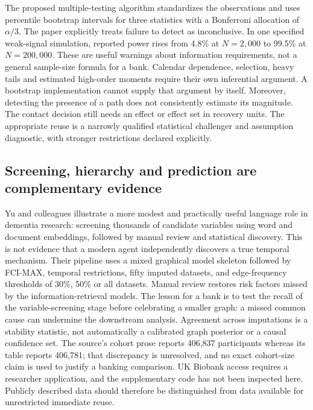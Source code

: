The proposed multiple-testing algorithm standardizes the observations and
uses percentile bootstrap intervals for three statistics with a Bonferroni
allocation of $\alpha/3$. The paper explicitly treats failure to detect as
inconclusive. In one specified weak-signal simulation, reported power rises
from 4.8\% at $N=2{,}000$ to 99.5\% at $N=200{,}000$. These are useful
warnings about information requirements, not a general sample-size formula
for a bank. Calendar dependence, selection, heavy tails and estimated
high-order moments require their own inferential argument. A bootstrap
implementation cannot supply that argument by itself. Moreover, detecting
the presence of a path does not consistently estimate its magnitude. The
contact decision still needs an effect or effect set in recovery units.
The appropriate reuse is a narrowly qualified statistical challenger and
assumption diagnostic, with stronger restrictions declared explicitly.
\citep{exec15_latent_shi}

\subsection{Screening, hierarchy and prediction are complementary evidence}

Yu and colleagues illustrate a more modest and practically useful language
role in dementia research: screening thousands of candidate variables using
word and document embeddings, followed by manual review and statistical
discovery. This is not evidence that a modern agent independently discovers
a true temporal mechanism. Their pipeline uses a mixed graphical model
skeleton followed by FCI-MAX, temporal restrictions, fifty imputed datasets,
and edge-frequency thresholds of 30\%, 50\% or all datasets. Manual review
restores risk factors missed by the information-retrieval models. The lesson
for a bank is to test the recall of the variable-screening stage before
celebrating a smaller graph: a missed common cause can undermine the
downstream analysis. Agreement across imputations is a stability statistic,
not automatically a calibrated graph posterior or a causal confidence set.
The source's cohort prose reports 406,837 participants whereas its table
reports 406,781; that discrepancy is unresolved, and no exact cohort-size
claim is used to justify a banking comparison. UK Biobank access requires a
researcher application, and the supplementary code has not been inspected
here. Publicly described data should therefore be distinguished from data
available for unrestricted immediate reuse.
\citep{exec15_latent_yu}


